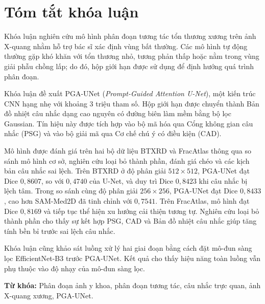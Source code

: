 \chapter*{Tóm tắt khóa luận}

Khóa luận nghiên cứu mô hình phân đoạn tương tác tổn thương xương trên ảnh X-quang nhằm hỗ trợ bác sĩ xác định vùng bất thường. Các mô hình tự động thường gặp khó khăn với tổn thương nhỏ, tương phản thấp hoặc nằm trong vùng giải phẫu chồng lấp; do đó, hộp giới hạn được sử dụng để định hướng quá trình phân đoạn.

Khóa luận đề xuất PGA-UNet (\textit{Prompt-Guided Attention U-Net}), một kiến trúc CNN hạng nhẹ với khoảng 3 triệu tham số. Hộp giới hạn được chuyển thành Bản đồ nhiệt câu nhắc dạng cao nguyên có đường biên làm mềm bằng bộ lọc Gaussian. Tín hiệu này được tích hợp vào bộ mã hóa qua Cổng không gian câu nhắc (PSG) và vào bộ giải mã qua Cơ chế chú ý có điều kiện (CAD).

Mô hình được đánh giá trên hai bộ dữ liệu BTXRD và FracAtlas thông qua so sánh mô hình cơ sở, nghiên cứu loại bỏ thành phần, đánh giá chéo và các kịch bản câu nhắc sai lệch. Trên BTXRD ở độ phân giải $512\times512$, PGA-UNet đạt Dice $0{,}8607$, so với $0{,}4740$ của U-Net, và duy trì Dice $0{,}8423$ khi câu nhắc bị lệch tâm. Trong so sánh cùng độ phân giải $256\times256$, PGA-UNet đạt Dice $0{,}8433$, cao hơn SAM-Med2D đã tinh chỉnh với $0{,}7541$. Trên FracAtlas, mô hình đạt Dice $0{,}8169$ và tiếp tục thể hiện xu hướng cải thiện tương tự. Nghiên cứu loại bỏ thành phần cho thấy sự kết hợp PSG, CAD và Bản đồ nhiệt câu nhắc giúp tăng tính bền bỉ trước sai lệch câu nhắc.

Khóa luận cũng khảo sát luồng xử lý hai giai đoạn bằng cách đặt mô-đun sàng lọc EfficientNet-B3 trước PGA-UNet. Kết quả cho thấy hiệu năng toàn luồng vẫn phụ thuộc vào độ nhạy của mô-đun sàng lọc.

\noindent\textbf{Từ khóa:} Phân đoạn ảnh y khoa, phân đoạn tương tác, câu nhắc trực quan, ảnh X-quang xương, PGA-UNet.